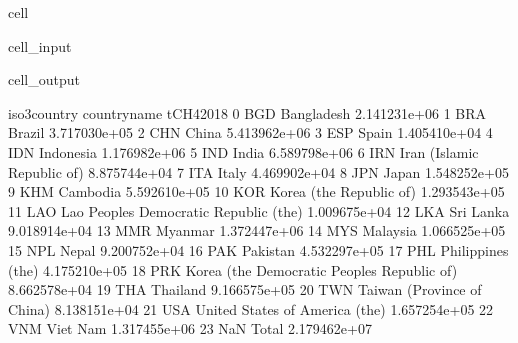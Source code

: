 \documentclass[letterpaper,10pt,english]{jupyterBook}
\begin{document}
\begin{sphinxuseclass}{cell}\begin{sphinxVerbatimInput}

\begin{sphinxuseclass}{cell_input}
\begin{sphinxVerbatim}[commandchars=\\\{\}]
\end{sphinxVerbatim}

\end{sphinxuseclass}\end{sphinxVerbatimInput}
\begin{sphinxVerbatimOutput}

\begin{sphinxuseclass}{cell_output}
\begin{sphinxVerbatim}[commandchars=\\\{\}]
   iso3\PYGZus{}country                                 country\PYGZus{}name     tCH4\PYGZus{}2018
0           BGD                                   Bangladesh  2.141231e+06
1           BRA                                       Brazil  3.717030e+05
2           CHN                                        China  5.413962e+06
3           ESP                                        Spain  1.405410e+04
4           IDN                                    Indonesia  1.176982e+06
5           IND                                        India  6.589798e+06
6           IRN                   Iran (Islamic Republic of)  8.875744e+04
7           ITA                                        Italy  4.469902e+04
8           JPN                                        Japan  1.548252e+05
9           KHM                                     Cambodia  5.592610e+05
10          KOR                      Korea (the Republic of)  1.293543e+05
11          LAO       Lao People\PYGZsq{}s Democratic Republic (the)  1.009675e+04
12          LKA                                    Sri Lanka  9.018914e+04
13          MMR                                      Myanmar  1.372447e+06
14          MYS                                     Malaysia  1.066525e+05
15          NPL                                        Nepal  9.200752e+04
16          PAK                                     Pakistan  4.532297e+05
17          PHL                            Philippines (the)  4.175210e+05
18          PRK  Korea (the Democratic People\PYGZsq{}s Republic of)  8.662578e+04
19          THA                                     Thailand  9.166575e+05
20          TWN                   Taiwan (Province of China)  8.138151e+04
21          USA               United States of America (the)  1.657254e+05
22          VNM                                     Viet Nam  1.317455e+06
23          NaN                                        Total  2.179462e+07
\end{sphinxVerbatim}

\end{sphinxuseclass}\end{sphinxVerbatimOutput}

\end{sphinxuseclass}
\end{document}
